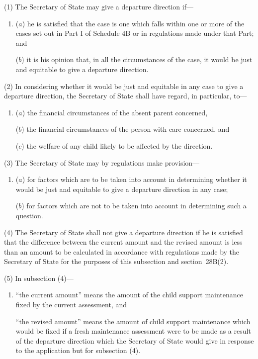 \documentclass[12pt,a4paper]{article}
\begin{document}
(1) The Secretary of State may give a departure direction if—
\begin{enumerate}\item[]
($a$) he is satisfied that the case is one which falls within one or more of the cases set out in Part I of Schedule 4B or in regulations made under that Part; and

($b$) it is his opinion that, in all the circumstances of the case, it would be just and equitable to give a departure direction.
\end{enumerate}

(2) In considering whether it would be just and equitable in any case to give a departure direction, the Secretary of State shall have regard, in particular, to—
\begin{enumerate}\item[]
($a$) the financial circumstances of the absent parent concerned,

($b$) the financial circumstances of the person with care concerned, and

($c$) the welfare of any child likely to be affected by the direction.
\end{enumerate}

(3) The Secretary of State may by regulations make provision—
\begin{enumerate}\item[]
($a$) for factors which are to be taken into account in determining whether it would be just and equitable to give a departure direction in any case;

($b$) for factors which are not to be taken into account in determining such a question.
\end{enumerate}

(4) The Secretary of State shall not give a departure direction if he is satisfied that the difference between the current amount and the revised amount is less than an amount to be calculated in accordance with regulations made by the Secretary of State for the purposes of this subsection and section~28B(2).

(5) In subsection (4)—
\begin{enumerate}\item[]
    “the current amount” means the amount of the child support maintenance fixed by the current assessment, and

    “the revised amount” means the amount of child support maintenance which would be fixed if a fresh maintenance assessment were to be made as a result of the departure direction which the Secretary of State would give in response to the application but for subsection (4). 
\end{enumerate}
\end{document}
